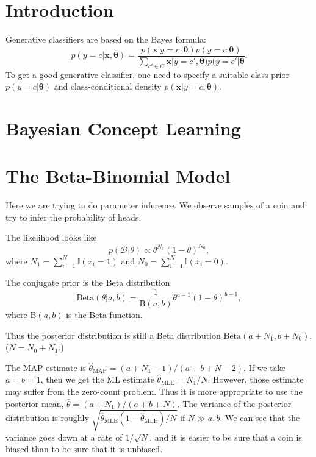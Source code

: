\documentclass[openany]{book}
\begin{document}
\section{Introduction}
Generative classifiers are based on the Bayes formula:
\begin{equation}\label{bayesform}
p(y=c|\mathbf{x},\boldsymbol{\theta})=\frac{p(\mathbf{x}|y=c,\boldsymbol{\theta})p(y=c|\boldsymbol{\theta})}{\sum_{c'\in C}\mathbf{x}|y=c',\boldsymbol{\theta})p(y=c'|\boldsymbol{\theta}}.
\end{equation}
To get a good generative classifier, one need to specify a suitable class prior $p(y=c|\boldsymbol{\theta})$ and class-conditional density $p(\mathbf{x}|y=c,\boldsymbol{\theta})$.

\section{Bayesian Concept Learning}

\section{The Beta-Binomial Model}
Here we are trying to do parameter inference. We observe samples of a coin and try to infer the probability of heads.

The likelihood looks like
\begin{equation}
p(\mathcal{D}|\theta)\propto\theta^{N_1}(1-\theta)^{N_0},
\end{equation}
where $N_1=\sum_{i=1}^N\mathbb{I}(x_i=1)$ and $N_0=\sum_{i=1}^N\mathbb{I}(x_i=0)$.

The conjugate prior is the Beta distribution
\begin{equation}
\mathrm{Beta}(\theta|a,b)=\frac{1}{\mathrm{B}(a,b)}\theta^{a-1}(1-\theta)^{b-1},
\end{equation}
where $\mathrm{B}(a,b)$ is the Beta function.

Thus the posterior distribution is still a Beta distribution $\mathrm{Beta}(a+N_1,b+N_0)$. ($N=N_0+N_1$.)

The MAP estimate is $\hat{\theta}_{\mathrm{MAP}}=(a+N_1-1)/(a+b+N-2)$. If we take $a=b=1$, then we get the ML estimate $\hat{\theta}_{\mathrm{MLE}}=N_1/N$. However, those estimate may suffer from the zero-count problem. Thus it is more appropriate to use the posterior mean, $\bar{\theta}=(a+N_1)/(a+b+N)$. The variance of the posterior distribution is roughly $\sqrt{\hat{\theta}_{\mathrm{MLE}}(1-\hat{\theta}_{\mathrm{MLE}})/N}$ if $N\gg a,b$. We can see that the variance goes down at a rate of $1/\sqrt{N}$, and it is easier to be sure that a coin is biased than to be sure that it is unbiased.
\end{document}
